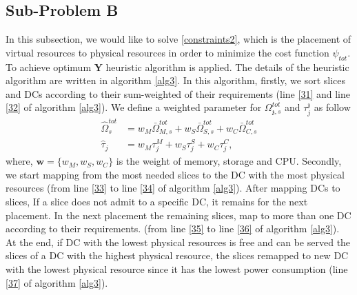 \documentclass[conference]{IEEEtran}
\begin{document}
\subsection{Sub-Problem B}
In this subsection, we would like to solve  \eqref{constraints2}, which is the placement of virtual resources to physical resources in order to minimize the cost function $\psi_{tot}$.
To achieve optimum $\boldsymbol{Y}$ heuristic algorithm is applied. The details of the heuristic algorithm are written in algorithm \eqref{alg3}. In this algorithm, firstly, we sort slices and DCs according to their sum-weighted of their requirements (line \ref{31} and line \ref{32} of algorithm \ref{alg3}).
We define a weighted parameter for $\Omega_{\mathfrak{z},s}^{tot}$ and $\tau_j^\mathfrak{z}$ as follow
\begin{equation}\label{wt}
\begin{split}
\hat{\Omega}_{s}^{tot} &= w_M \bar{\Omega}_{M,s}^{tot} + w_S \bar{\Omega}_{S,s}^{tot} + w_C \bar{\Omega}_{C,s}^{tot} \\
\hat{\tau}_j &= w_M \tau_{{j}}^M + w_S \tau_{{j}}^S + w_C \tau_{{j}}^C,
\end{split}
\end{equation}
where, $\boldsymbol{w} = \{w_M, w_S, w_C\}$ is the weight of memory, storage and CPU.
Secondly, we start mapping from the most needed slices to the DC with the most physical resources (from line \ref{33} to line \ref{34} of algorithm \ref{alg3}). After mapping DCs to slices, If a slice does not admit to a specific DC, it remains for the next placement. In the next placement the remaining slices, map to more than one DC according to their requirements. (from line \ref{35} to line \ref{36} of algorithm \ref{alg3}). At the end, if DC with the lowest physical resources is free and can be served the slices of a DC with the highest physical resource, the slices remapped to new DC with the lowest physical resource since it has the lowest power consumption (line \ref{37} of algorithm \ref{alg3}).
\end{document}
